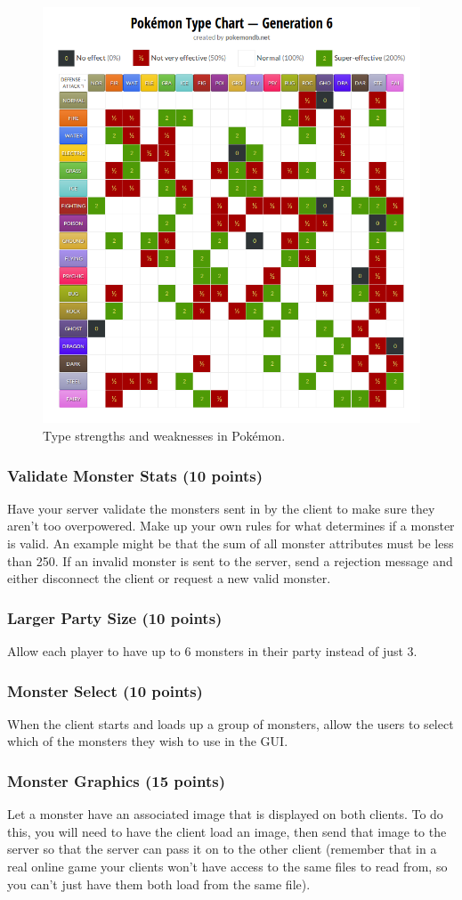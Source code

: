 \documentclass[11pt]{cselabheader}
\begin{document}
\begin{figure}[h]
  \centering
  \includegraphics[width=0.5\linewidth]{img/typechart}
  \caption{Type strengths and weaknesses in Pok\'emon.}
  \label{types}
\end{figure}

\subsubsection{Validate Monster Stats (10 points)}
\label{subsubsec:valid}
Have your server validate the monsters sent in by the client to make sure they
aren't too overpowered. Make up your own rules for what determines if a monster
is valid. An example might be that the sum of all monster attributes must be less
than 250. If an invalid monster is sent to the server, send a rejection message
and either disconnect the client or request a new valid monster.

\subsubsection{Larger Party Size (10 points)}
Allow each player to have up to 6 monsters in their party instead of just 3.

\subsubsection{Monster Select (10 points)}
When the client starts and loads up a group of monsters, allow the users
to select which of the monsters they wish to use in the GUI.

\subsubsection{Monster Graphics (15 points)}
Let a monster have an associated image that is displayed on both clients.
To do this, you will need to have the client load an image, then send that
image to the server so that the server can pass it on to the other client
(remember that in a real online game
your clients won't have access to the same
files to read from, so you can't just have them both load from the same
file).
\end{document}
